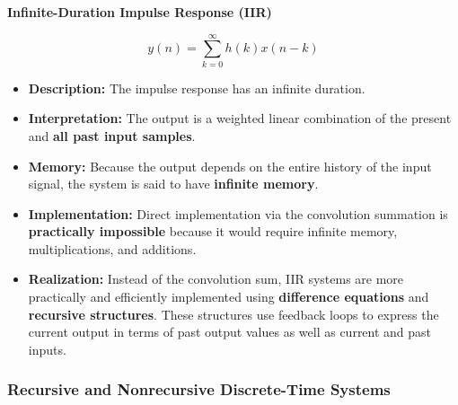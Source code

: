\textbf{Infinite-Duration Impulse Response (IIR)}

\[ y(n) = \sum_{k=0}^{\infty} h(k)x(n-k) \]

\begin{itemize}
\tightlist
\item
  \textbf{Description:} The impulse response has an infinite duration.
\item
  \textbf{Interpretation:} The output is a weighted linear combination
  of the present and \textbf{all past input samples}.
\item
  \textbf{Memory:} Because the output depends on the entire history of
  the input signal, the system is said to have \textbf{infinite memory}.
\item
  \textbf{Implementation:} Direct implementation via the convolution
  summation is \textbf{practically impossible} because it would require
  infinite memory, multiplications, and additions.
\item
  \textbf{Realization:} Instead of the convolution sum, IIR systems are
  more practically and efficiently implemented using \textbf{difference
  equations} and \textbf{recursive structures}. These structures use
  feedback loops to express the current output in terms of past output
  values as well as current and past inputs.
\end{itemize}

\subsubsection{Recursive and Nonrecursive Discrete-Time
Systems}\label{recursive-and-nonrecursive-discrete-time-systems}

